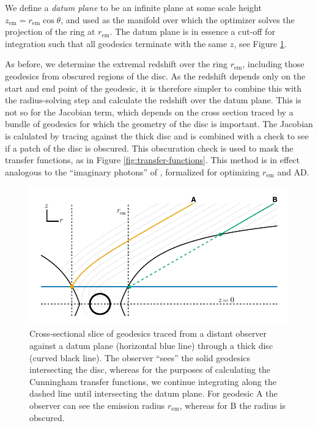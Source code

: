 \documentclass[fleqn,usenatbib]{mnras}
\begin{document}
We define a \emph{datum plane} to be an infinite plane at some scale height
$z_\text{em} = r_\text{em} \cos \theta$, and used as the manifold over which the
optimizer solves the projection of the ring at $r_\text{em}$. The datum plane
is in essence a cut-off for integration such that all geodesics terminate with
the same $z$, see Figure \ref{fig:datum-plane-tracing}.

As before, we determine the extremal redshift over the ring $r_\text{em}$,
including those geodesics from obscured regions of the disc. As the redshift
depends only on the start and end point of the geodesic, it is therefore simpler
to combine this with the radius-solving step and calculate the redshift over the
datum plane. This is not so for the Jacobian term, which depends on the cross
section traced by a bundle of geodesics for which the geometry of the disc is
important. The Jacobian is calulated by tracing against the thick disc and is
combined with a check to see if a patch of the disc is obscured. This
obscuration check is used to mask the transfer functions, as in Figure
\ref{fig:transfer-functions}. This method is in effect analogous to the
``imaginary photons'' of \cite{abdikamalov_testing_2020}, formalized for
optimizing $r_\text{em}$ and AD.

\begin{figure}
    \centering
    \includegraphics[width=0.95\linewidth]{figures/datum-plane.pdf}
    \caption{Cross-sectional slice of geodesics traced from a distant observer
        against a datum plane (horizontal blue line) through a thick disc
        (curved black line). The observer ``sees'' the solid geodesics
        intersecting the disc, whereas for the purposes of calculating the
        Cunningham transfer functions, we continue integrating along the dashed
        line until intersecting the datum plane. For geodesic A the observer
        can see the emission radius $r_\text{em}$, whereas for B the radius is
        obscured.
}
    \label{fig:datum-plane-tracing}
\end{figure}
\end{document}
